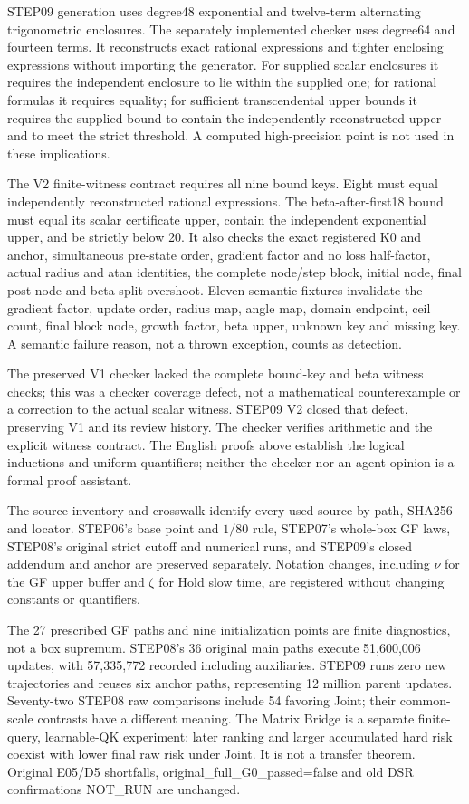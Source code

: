 \documentclass[11pt,a4paper]{article}
\begin{document}
STEP09 generation uses degree48 exponential and twelve-term alternating trigonometric enclosures. The separately implemented checker uses degree64 and fourteen terms. It reconstructs exact rational expressions and tighter enclosing expressions without importing the generator. For supplied scalar enclosures it requires the independent enclosure to lie within the supplied one; for rational formulas it requires equality; for sufficient transcendental upper bounds it requires the supplied bound to contain the independently reconstructed upper and to meet the strict threshold. A computed high-precision point is not used in these implications.

The V2 finite-witness contract requires all nine bound keys. Eight must equal independently reconstructed rational expressions. The beta-after-first18 bound must equal its scalar certificate upper, contain the independent exponential upper, and be strictly below 20. It also checks the exact registered K0 and anchor, simultaneous pre-state order, gradient factor and no loss half-factor, actual radius and atan identities, the complete node/step block, initial node, final post-node and beta-split overshoot. Eleven semantic fixtures invalidate the gradient factor, update order, radius map, angle map, domain endpoint, ceil count, final block node, growth factor, beta upper, unknown key and missing key. A semantic failure reason, not a thrown exception, counts as detection.

The preserved V1 checker lacked the complete bound-key and beta witness checks; this was a checker coverage defect, not a mathematical counterexample or a correction to the actual scalar witness. STEP09 V2 closed that defect, preserving V1 and its review history. The checker verifies arithmetic and the explicit witness contract. The English proofs above establish the logical inductions and uniform quantifiers; neither the checker nor an agent opinion is a formal proof assistant.

The source inventory and crosswalk identify every used source by path, SHA256 and locator. STEP06's base point and $1/80$ rule, STEP07's whole-box GF laws, STEP08's original strict cutoff and numerical runs, and STEP09's closed addendum and anchor are preserved separately. Notation changes, including $\nu$ for the GF upper buffer and $\zeta$ for Hold slow time, are registered without changing constants or quantifiers.

The 27 prescribed GF paths and nine initialization points are finite diagnostics, not a box supremum. STEP08's 36 original main paths execute 51,600,006 updates, with 57,335,772 recorded including auxiliaries. STEP09 runs zero new trajectories and reuses six anchor paths, representing 12 million parent updates. Seventy-two STEP08 raw comparisons include 54 favoring Joint; their common-scale contrasts have a different meaning. The Matrix Bridge is a separate finite-query, learnable-QK experiment: later ranking and larger accumulated hard risk coexist with lower final raw risk under Joint. It is not a transfer theorem. Original E05/D5 shortfalls, original\_full\_G0\_passed=false and old DSR confirmations NOT\_RUN are unchanged.
\end{document}
